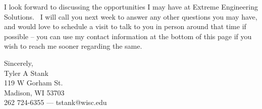 \documentclass[12pt,letterpaper]{article}
\begin{document}
\par I look forward to discussing the opportunities I may have at Extreme Engineering Solutions.~
    I will call you next week to answer any other questions you may have, and would love to schedule a visit to talk to you in person around that time if possible -- you can use my contact information at the bottom of this page if you wish to reach me sooner regarding the same.~

\par Sincerely,\\
Tyler A Stank\\
119 W Gorham St.\\
Madison, WI 53703\\
262 724-6355 --- tstank@wisc.edu
\end{document}
